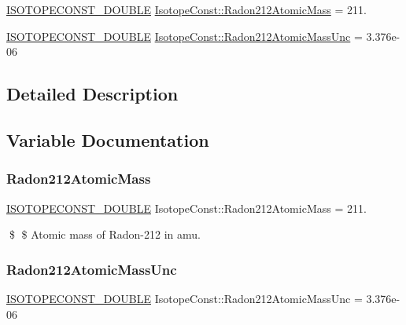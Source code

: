 \begin{DoxyCompactItemize}
\item 
\mbox{\hyperlink{group___isotope_const-_macros_ga8f45a7272ce02c0b4c65c44636ed719a}{I\+S\+O\+T\+O\+P\+E\+C\+O\+N\+S\+T\+\_\+\+D\+O\+U\+B\+LE}} \mbox{\hyperlink{group___isotope_const-_radon-_rn212_ga50055d9de33ee74b074b8f17e55a1dbf}{Isotope\+Const\+::\+Radon212\+Atomic\+Mass}} = 211.
\item 
\mbox{\hyperlink{group___isotope_const-_macros_ga8f45a7272ce02c0b4c65c44636ed719a}{I\+S\+O\+T\+O\+P\+E\+C\+O\+N\+S\+T\+\_\+\+D\+O\+U\+B\+LE}} \mbox{\hyperlink{group___isotope_const-_radon-_rn212_ga6dae90ff34b13bf69a6be5cf80a00c38}{Isotope\+Const\+::\+Radon212\+Atomic\+Mass\+Unc}} = 3.\+376e-\/06
\end{DoxyCompactItemize}


\subsection{Detailed Description}


\subsection{Variable Documentation}
\mbox{\label{group___isotope_const-_radon-_rn212_ga50055d9de33ee74b074b8f17e55a1dbf}} 
\subsubsection{\texorpdfstring{Radon212\+Atomic\+Mass}{Radon212AtomicMass}}
{\footnotesize\ttfamily \mbox{\hyperlink{group___isotope_const-_macros_ga8f45a7272ce02c0b4c65c44636ed719a}{I\+S\+O\+T\+O\+P\+E\+C\+O\+N\+S\+T\+\_\+\+D\+O\+U\+B\+LE}} Isotope\+Const\+::\+Radon212\+Atomic\+Mass = 211.}

\$ \$ Atomic mass of Radon-\/212 in amu. \mbox{\label{group___isotope_const-_radon-_rn212_ga6dae90ff34b13bf69a6be5cf80a00c38}} 
\subsubsection{\texorpdfstring{Radon212\+Atomic\+Mass\+Unc}{Radon212AtomicMassUnc}}
{\footnotesize\ttfamily \mbox{\hyperlink{group___isotope_const-_macros_ga8f45a7272ce02c0b4c65c44636ed719a}{I\+S\+O\+T\+O\+P\+E\+C\+O\+N\+S\+T\+\_\+\+D\+O\+U\+B\+LE}} Isotope\+Const\+::\+Radon212\+Atomic\+Mass\+Unc = 3.\+376e-\/06}

